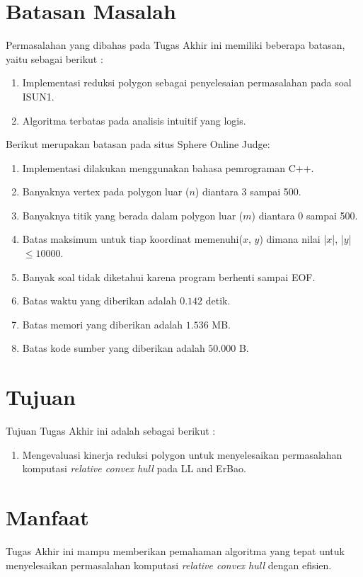 \section{ Batasan Masalah}
\label{sec:batasan_masalah}
Permasalahan yang dibahas pada Tugas Akhir ini memiliki beberapa batasan, yaitu sebagai berikut :
\begin{enumerate}
    \item Implementasi reduksi polygon sebagai penyelesaian permasalahan \RCH pada soal ISUN1.
    \item Algoritma \RCH terbatas pada analisis intuitif yang logis.
\end{enumerate}
Berikut merupakan batasan pada situs Sphere Online Judge: 
\begin {enumerate}
    \item Implementasi dilakukan menggunakan bahasa pemrograman C++.
    \item Banyaknya vertex pada polygon luar ($n$) diantara 3 sampai 500.
    \item Banyaknya titik yang berada dalam polygon luar ($m$) diantara 0 sampai 500.
    \item Batas maksimum untuk tiap koordinat memenuhi($ x $, $ y $) dimana nilai |$x$|, |$y$| $\leq 10000$. 
    \item Banyak soal tidak diketahui karena program berhenti sampai EOF.
    \item Batas waktu yang diberikan adalah $ 0.142 $ detik.
    \item Batas memori yang diberikan adalah $ 1.536 $ MB.
    \item Batas kode sumber yang diberikan adalah $ 50.000 $ B. 
\end {enumerate}

\section { Tujuan}
Tujuan Tugas Akhir ini adalah sebagai berikut :
\begin{enumerate}
    \item Mengevaluasi kinerja reduksi polygon untuk menyelesaikan permasalahan komputasi \textit{relative convex hull} pada LL and ErBao.
\end{enumerate}

\section { Manfaat}
Tugas Akhir ini mampu memberikan pemahaman algoritma yang tepat untuk menyelesaikan permasalahan komputasi \textit{relative convex hull} dengan efisien.

